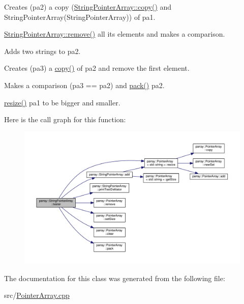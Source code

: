 Creates (pa2) a copy (\hyperlink{classparray_1_1PointerArray_a3010540e156076377ffd4428b05e1ac2}{String\-Pointer\-Array\-::copy()} and String\-Pointer\-Array(\-String\-Pointer\-Array)) of pa1.

\hyperlink{classparray_1_1PointerArray_a13ae3b9b2118416351cc63bd456ecf73}{String\-Pointer\-Array\-::remove()} all its elements and makes a comparison.

Adds two strings to pa2.

Creates (pa3) a \hyperlink{classparray_1_1PointerArray_a3010540e156076377ffd4428b05e1ac2}{copy()} of pa2 and remove the first element.

Makes a comparison (pa3 == pa2) and \hyperlink{classparray_1_1PointerArray_a13883fc7ef994a50a83ae3f9ddc4db27}{pack()} pa2.

\hyperlink{classparray_1_1PointerArray_a6d4347a899d2783d23775957ad71f743}{resize()} pa1 to be bigger and smaller. 

Here is the call graph for this function\-:\nopagebreak
\begin{figure}[H]
\begin{center}
\leavevmode
\includegraphics[width=350pt]{classparray_1_1StringPointerArray_abfac13570bec8c88311714d19ddea59b_cgraph}
\end{center}
\end{figure}




The documentation for this class was generated from the following file\-:\begin{DoxyCompactItemize}
\item 
src/\hyperlink{PointerArray_8cpp}{Pointer\-Array.\-cpp}\end{DoxyCompactItemize}
